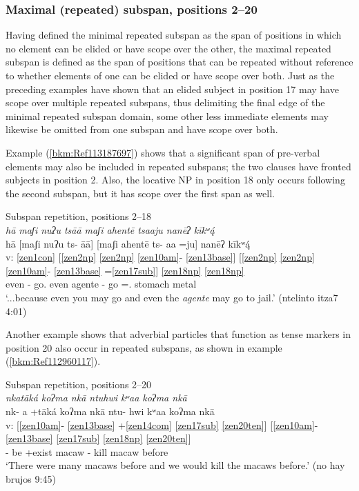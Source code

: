 \documentclass[output=paper]{langscibook}
\begin{document}
\subsubsection{Maximal (repeated) subspan, positions 2{}--20}
\label{bkm:Ref113226455}
Having defined the minimal repeated subspan as the span of positions in which no element can be elided or have scope over the other, the maximal repeated subspan is defined as the span of positions that can be repeated without reference to whether elements of one can be elided or have scope over both. Just as the preceding examples have shown that an elided subject in position 17 may have scope over multiple repeated subspans, thus delimiting the final edge of the minimal repeated subspan domain, some other less immediate elements may likewise be omitted from one subspan and have scope over both.

Example (\ref{bkm:Ref113187697}) shows that a significant span of pre-verbal elements may also be included in repeated subspans; the two clauses have fronted subjects in position 2. Also, the locative NP in position 18 only occurs following the second subspan, but it has scope over the first span as well.


\ea\label{bkm:Ref113187697}Subspan repetition, positions 2{}--18\\
\textit{hā maʃi nuʔu tsāā maʃi ahentē tsaaju nanēʔ kīkʷ\'{ą}}\\
\glll {} hā [maʃi nuʔu ts- āā] [maʃi ahentē ts- aa =ju] nanēʔ kīkʷ\'{ą}\\
v: \ref{zen1con} [\ref{zen2np} \ref{zen2np} \ref{zen10am}{}- \ref{zen13base}] [\ref{zen2np} \ref{zen2np} \ref{zen10am}{}- \ref{zen13base} =\ref{zen17sub}] \ref{zen18np} \ref{zen18np} \\
{} \Sub{} even \Second\Sg{} \Pot{}- go.\Second\Sg{} even agente \Pot{}- go =\Third\Sg.\M{} stomach metal\\
\glt `...because even you may go and even the \textit{agente} may go to jail.' (ntelinto itza7 4:01)
\z

Another example shows that adverbial particles that function as tense markers in position 20 also occur in repeated subspans, as shown in example (\ref{bkm:Ref112960117}). 


\ea\label{bkm:Ref112960117}Subspan repetition, positions 2{}--20\\
\textit{ nkatāká koʔma nkā ntuhwi kʷaa koʔma nkā}\\
\glll {} nk- a +tāká koʔma nkā ntu- hwi kʷaa koʔma nkā\\
v: [\ref{zen10am}{}- \ref{zen13base} +\ref{zen14com} \ref{zen17sub} \ref{zen20ten}] [\ref{zen10am}{}- \ref{zen13base} \ref{zen17sub} \ref{zen18np} \ref{zen20ten}] \\
{} \Pfv{}- be +exist macaw \Pst{} \Pfv{}- kill \Second\Excl{} macaw before\\
\glt `There were many macaws before and we would kill the macaws before.' (no hay brujos 9:45)
\z
\end{document}

